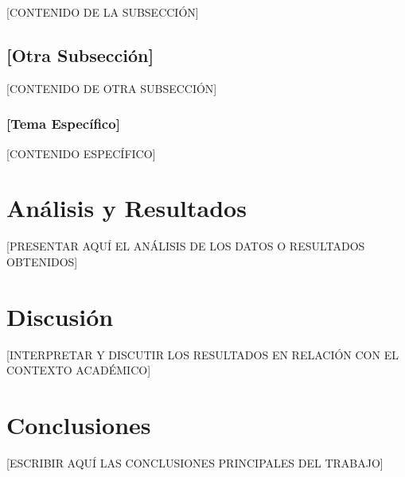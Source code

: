 \documentclass[12pt]{article}
\begin{document}
[CONTENIDO DE LA SUBSECCIÓN]


\subsection{[Otra Subsección]}

[CONTENIDO DE OTRA SUBSECCIÓN]

\subsubsection{[Tema Específico]}

[CONTENIDO ESPECÍFICO]

\section{Análisis y Resultados}

 [PRESENTAR AQUÍ EL ANÁLISIS DE LOS DATOS O RESULTADOS OBTENIDOS]

\section{Discusión}

 [INTERPRETAR Y DISCUTIR LOS RESULTADOS EN RELACIÓN CON EL CONTEXTO ACADÉMICO]

\section{Conclusiones}

 [ESCRIBIR AQUÍ LAS CONCLUSIONES PRINCIPALES DEL TRABAJO]


\newpage
\pagestyle{empty}                   %
\printbibliography[heading=bibintoc, title={Referencias}]
\end{document}
